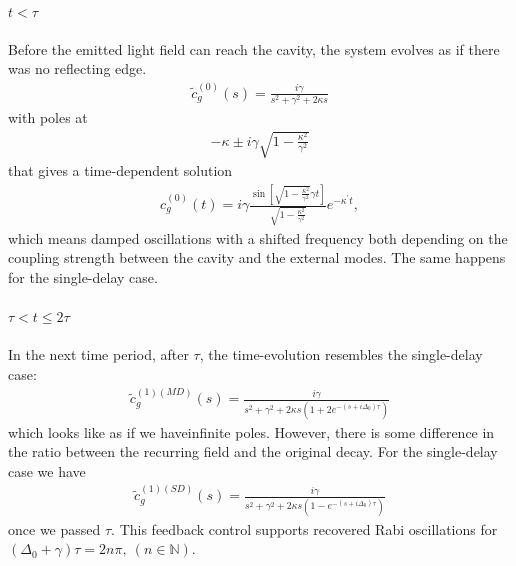 \documentclass[%
 reprint,
 amsmath,amssymb,
pra,
]{revtex4-1}
\def\kappap{{\kappa^\prime}}
\def\ctil{\tilde{c}}
\newcommand{\lsz}{\left[}
\newcommand{\rsz}{\right]}
\newcommand{\lk}{\left(}
\newcommand{\rk}{\right)}
\begin{document}
\paragraph{$t<\tau$}
Before the emitted light field can reach the cavity, the system evolves as if there was no reflecting edge.
\begin{align}
\ctil_g^{(0)}(s) = \frac{i\gamma}{s^2+\gamma^2+2\kappa s}
\end{align}
with poles at 
\begin{align}
-\kappa\pm i\gamma\sqrt{1-\frac{\kappa^2}{\gamma^2}}
\end{align}
that gives a time-dependent solution
\begin{align}
c_g^{(0)}(t) = i\gamma\frac{\sin{\lsz\sqrt{1-\frac{\kappa^2}{\gamma^2}}\gamma t\rsz}}{\sqrt{1-\frac{\kappa^2}{\gamma^2}}}e^{-\kappap t},
\end{align}
which means damped oscillations with a shifted frequency both depending on the coupling strength between the cavity and the external modes. The same happens for the single-delay case.

\paragraph{$\tau<t\leq 2\tau$}
In the next time period, after $\tau$, the time-evolution resembles the single-delay case:
\begin{align}
\ctil_g^{(1)(MD)}(s) = \frac{i\gamma}{s^2+\gamma^2+2\kappa s\lk1+2e^{-(s+i\Delta_0)\tau}\rk}
\end{align}
which looks like as if we haveinfinite poles. However, there is some difference in the ratio between the recurring field and the original decay. For the single-delay case we have
\begin{align}
\ctil_g^{(1)(SD)}(s) = \frac{i\gamma}{s^2+\gamma^2+2\kappa s\lk1-e^{-(s+i\Delta_0)\tau}\rk}
\end{align}
once we passed $\tau$. This feedback control supports recovered Rabi oscillations for $(\Delta_0+\gamma)\tau=2n\pi,\  (n\in \mathbb{N})$.
\end{document}
